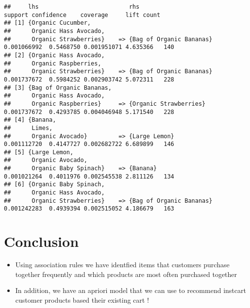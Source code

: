\documentclass[
]{article}
\begin{document}
\begin{verbatim}
##     lhs                          rhs                          support confidence    coverage     lift count
## [1] {Organic Cucumber,                                                                                     
##      Organic Hass Avocado,                                                                                 
##      Organic Strawberries}    => {Bag of Organic Bananas} 0.001066992  0.5468750 0.001951071 4.635366   140
## [2] {Organic Hass Avocado,                                                                                 
##      Organic Raspberries,                                                                                  
##      Organic Strawberries}    => {Bag of Organic Bananas} 0.001737672  0.5984252 0.002903742 5.072311   228
## [3] {Bag of Organic Bananas,                                                                               
##      Organic Hass Avocado,                                                                                 
##      Organic Raspberries}     => {Organic Strawberries}   0.001737672  0.4293785 0.004046948 5.171540   228
## [4] {Banana,                                                                                               
##      Limes,                                                                                                
##      Organic Avocado}         => {Large Lemon}            0.001112720  0.4147727 0.002682722 6.689899   146
## [5] {Large Lemon,                                                                                          
##      Organic Avocado,                                                                                      
##      Organic Baby Spinach}    => {Banana}                 0.001021264  0.4011976 0.002545538 2.811126   134
## [6] {Organic Baby Spinach,                                                                                 
##      Organic Hass Avocado,                                                                                 
##      Organic Strawberries}    => {Bag of Organic Bananas} 0.001242283  0.4939394 0.002515052 4.186679   163
\end{verbatim}

\section{\texorpdfstring{\textbf{Conclusion}}{Conclusion}}\label{conclusion}

\begin{itemize}
\item
  Using association rules we have identfied items that customers
  purchase together frequently and which products are most often
  purchased together
\item
  In addition, we have an apriori model that we can use to recommend
  instcart customer products based their existing cart !
\end{itemize}
\end{document}
